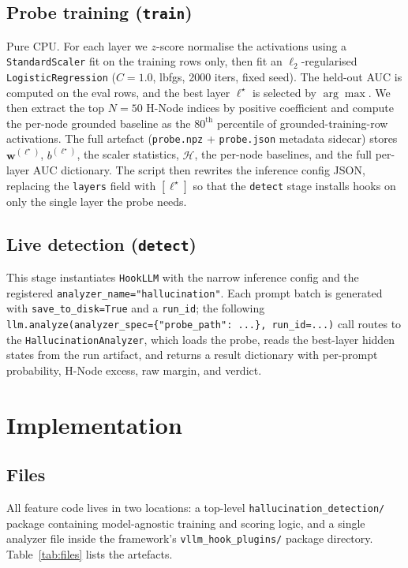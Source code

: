 \documentclass[11pt]{article}
\begin{document}
\subsection{Probe training (\texttt{train})}
Pure CPU. For each layer we $z$-score normalise the activations using a
\texttt{StandardScaler} fit on the training rows only, then fit an $\ell_2$-regularised
\texttt{LogisticRegression} ($C{=}1.0$, lbfgs, 2000 iters, fixed seed). The held-out AUC is
computed on the eval rows, and the best layer $\ell^\star$ is selected by $\arg\max$. We then
extract the top $N{=}50$ H-Node indices by positive coefficient and compute the per-node
grounded baseline as the $80^{\text{th}}$ percentile of grounded-training-row activations. The
full artefact (\texttt{probe.npz} + \texttt{probe.json} metadata sidecar) stores
$\mathbf{w}^{(\ell^\star)}$, $b^{(\ell^\star)}$, the scaler statistics, $\mathcal{H}$, the
per-node baselines, and the full per-layer AUC dictionary. The script then rewrites the
inference config JSON, replacing the \texttt{layers} field with $[\ell^\star]$ so that the
\texttt{detect} stage installs hooks on only the single layer the probe needs.

\subsection{Live detection (\texttt{detect})}
This stage instantiates \texttt{HookLLM} with the narrow inference config and the registered
\texttt{analyzer\_name="hallucination"}. Each prompt batch is generated with
\texttt{save\_to\_disk=True} and a \texttt{run\_id}; the following
\texttt{llm.analyze(analyzer\_spec=\{"probe\_path": ...\}, run\_id=...)} call routes to the
\texttt{HallucinationAnalyzer}, which loads the probe, reads the best-layer hidden states from
the run artifact, and returns a result dictionary with per-prompt probability, H-Node excess,
raw margin, and verdict.

\section{Implementation}

\subsection{Files}
All feature code lives in two locations: a top-level \texttt{hallucination\_detection/}
package containing model-agnostic training and scoring logic, and a single analyzer file
inside the framework's \texttt{vllm\_hook\_plugins/} package directory. Table~\ref{tab:files}
lists the artefacts.
\end{document}
